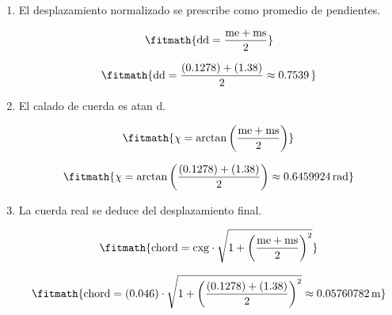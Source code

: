 \begin{enumerate}

\item El desplazamiento normalizado se prescribe como promedio de pendientes.

\[\fitmath{\mathrm{dd}=\frac{\mathrm{me}+\mathrm{ms}}{2}}\]

\[\fitmath{\mathrm{dd}=\frac{(0.1278)+(1.38)}{2}\approx 0.7539\,}\]

\item El calado de cuerda es atan d.

\[\fitmath{\chi=\arctan\left(\frac{\mathrm{me}+\mathrm{ms}}{2}\right)}\]

\[\fitmath{\chi=\arctan\left(\frac{(0.1278)+(1.38)}{2}\right)\approx 0.6459924\,\mathrm{rad}}\]

\item La cuerda real se deduce del desplazamiento final.

\[\fitmath{\mathrm{chord}=\mathrm{cxg}\cdot \sqrt{1+{\left(\frac{\mathrm{me}+\mathrm{ms}}{2}\right)}^{2}}}\]

\[\fitmath{\mathrm{chord}=(0.046)\cdot \sqrt{1+{\left(\frac{(0.1278)+(1.38)}{2}\right)}^{2}}\approx 0.05760782\,\mathrm{m}}\]

\end{enumerate}
